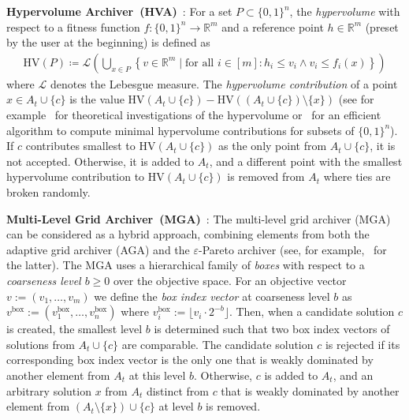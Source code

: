 \documentclass[
sigconf = false, %
review = false, %
screen = true, %
anonymous = true, %
format=acmsmall
]{acmart}
\newcommand{\hv}{\ensuremath{\mathrm{HV}}\xspace}
\begin{document}
\textbf{Hypervolume Archiver~(HVA)}~\cite{10.1109/TEVC.2003.810755, KnowlesPhD}: For a set $P \subset \{0,1\}^n$, the \emph{hypervolume} with respect to a fitness function $f\colon \{0,1\}^n \rightarrow \mathbb{R}^m$ and a reference point $h \in \mathbb{R}^m$ (preset by the user at the beginning) is defined as
\begin{align*}
\hv(P) \coloneqq \mathcal{L}\left(\bigcup_{x\in P} \left\{v\in\mathbb{R}^m\mid \text{for all } i \in [m]: h_i \leq v_i \wedge v_i \leq f_i(x)\right\}\right)
\end{align*}
where $\mathcal{L}$ denotes the Lebesgue measure. The \emph{hypervolume contribution} of a point $x \in A_t \cup \{c\}$ is the value $\hv(A_t \cup \{c\}) - \hv((A_t \cup \{c\}) \setminus \{x\})$ (see for example~\cite{AUGER201275,ZitzlerPhD} for theoretical investigations of the hypervolume or~\cite{HYPERALGO} for an efficient algorithm to compute minimal hypervolume contributions for subsets of $\{0,1\}^n$). If $c$ contributes smallest to $\hv(A_t \cup \{c\})$ as the only point from $A_t \cup \{c\}$, it is not accepted. Otherwise, it is added to $A_t$, and a different point with the smallest hypervolume contribution to $\hv(A_t \cup \{c\})$ is removed from $A_t$ where ties are broken randomly.

\textbf{Multi-Level Grid Archiver~(MGA)}~\cite{LAUMANNS2011414, LAUMANNS2011415}: 
The multi-level grid archiver (MGA) can be considered as a hybrid approach, combining elements from both the adaptive grid archiver (AGA) and the $\varepsilon$-Pareto archiver (see, for example,~\cite{Archiver2011} for the latter). %
The MGA uses a hierarchical family of \emph{boxes} with respect to a \emph{coarseness level $b \geq 0$} over the objective space. For an objective vector $v:=(v_1,\ldots , v_m)$ we define the \emph{box index vector} at coarseness level $b$ as $v^{\text{box}}:=(v_1^{\text{box}}, \ldots , v_n^{\text{box}})$ where $v_i^{\text{box}}:=\lfloor{v_i \cdot 2^{-b}}\rfloor$. Then, when a candidate solution $c$ is created, the smallest level $b$ is determined such that two box index vectors of solutions from $A_t \cup \{c\}$ are comparable. The candidate solution $c$ is rejected if its corresponding box index vector is the only one that is weakly dominated by another element from $A_t$ at this level $b$. Otherwise, $c$ is added to $A_t$, and an arbitrary solution $x$ from $A_t$ distinct from $c$ that is weakly dominated by another element from $(A_t \setminus \{x\}) \cup \{c\}$ at level $b$ is removed.
\end{document}
